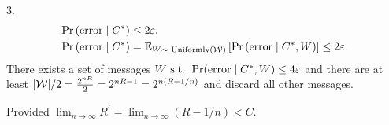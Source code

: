 3. \begin{align*}
\operatorname{Pr}\left(\text{error} \mid C^\ast\right) &\leq 2 \varepsilon.
\\
\operatorname{Pr}\left(\text{error} \mid C^\ast\right)
    &=\mathbb{E}_{W \sim \text{ Uniformly}(\mathcal{W})}\left[\operatorname{Pr}\left(\text{error} \mid C^\ast, W\right)\right] \leq 2 \varepsilon.
\end{align*}
There exists a set of messages $W\text{ s.t. }\Pr(\text{error}\mid C^\ast, W)\leq 4\varepsilon$ and there are at least $|\mathcal{W}|/2=\frac{2^{nR}}{2}=2^{nR-1}=2^{n(R-1/n)}$ and discard all other messages.

Provided $\displaystyle\lim _{n \rightarrow \infty} R^{\prime}=\lim _{n \rightarrow \infty}(R - 1 / n)<C$.


